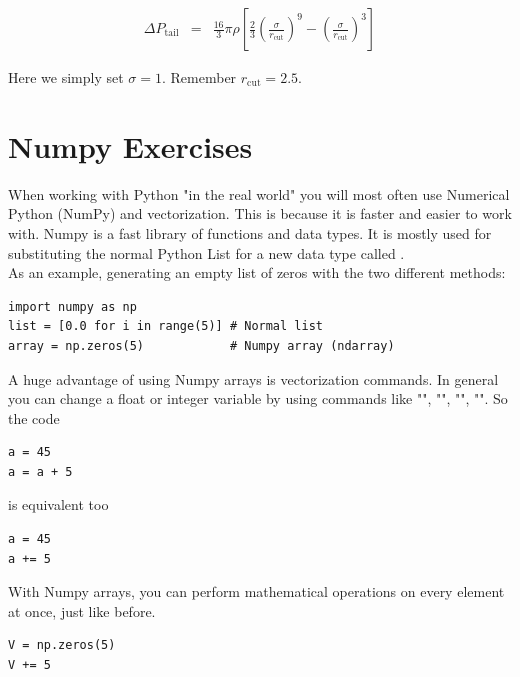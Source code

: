 \documentclass{article}
\begin{document}
\begin{eqnarray}
    \Delta P_\mathrm{tail} & = & \frac{16}{3}\pi \rho \left[ \frac{2}{3}\left( \frac{\sigma}{r_{\mathrm{cut}}} \right)^9 - \left(\frac{\sigma}{r_{\mathrm{cut}}} \right)^3 \right]
\end{eqnarray}

Here we simply set $\sigma = 1$. Remember $r_{\mathrm{cut}} = 2.5$.

\newpage


\section{Numpy Exercises}





When working with Python "in the real world" you will most often use Numerical Python (NumPy) and vectorization.
This is because it is faster and easier to work with.
Numpy is a fast library of functions and data types.
It is mostly used for substituting the normal Python List for a new data type called .\\

As an example, generating an empty list of zeros with the two different methods:

\begin{lstlisting}
import numpy as np
list = [0.0 for i in range(5)] # Normal list
array = np.zeros(5)            # Numpy array (ndarray)
\end{lstlisting}

A huge advantage of using Numpy arrays is vectorization commands.
In general you can change a float or integer variable by using commands like
"\code{+=}",
"\code{-=}",
"\code{*=}",
"\code{/=}". So the code

\begin{lstlisting}
a = 45
a = a + 5
\end{lstlisting}

is equivalent too

\begin{lstlisting}
a = 45
a += 5
\end{lstlisting}

With Numpy arrays, you can perform mathematical operations on every element at once,
just like before.
\begin{lstlisting}
V = np.zeros(5)
V += 5
\end{lstlisting}
\end{document}
